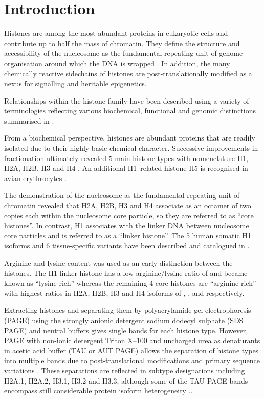 \section{Introduction}

  Histones are among the most abundant proteins in eukaryotic cells and contribute up to half the mass of chromatin. 
  They define the structure and accessibility of the nucleosome as the fundamental repeating unit of genome organisation 
  around which the DNA is wrapped .
  In addition, the many chemically reactive sidechains of histones are post-translationally modified 
  as a nexus for signalling and heritable epigenetics. 

  Relationships within the histone family have been described using a variety of terminologies
  reflecting various biochemical, functional and genomic distinctions summarised in .
  
  From a biochemical perspective, histones are abundant proteins 
  that are readily isolated due to their highly basic chemical character. 
  Successive improvements in fractionation ultimately revealed 5 main histone types 
  with nomenclature H1, H2A, H2B, H3 and H4 \citep{nomenclature}.
  An additional H1--related histone H5 is recognised in avian erythrocytes \citep{HFive-review}.

  The demonstration of the nucleosome as the fundamental repeating unit of chromatin  
  revealed that H2A, H2B, H3 and H4 associate as an octamer of two copies each within the
  nucleosome core particle, so they are referred to as ``core histones''. 
  In contrast, H1 associates with the linker DNA between nucleosome core particles and is referred to as a ``linker histone''. 
  The 5 human somatic H1 isoforms and 6 tissue-specific variants have been described and catalogued in .

  Arginine and lysine content was used as an early distinction between the histones. 
  The H1 linker histone has a low arginine/lysine ratio of \LinkerArgLysRatio{} and became known as ``lysine-rich'' 
  whereas the remaining 4 core histones are ``arginine-rich'' with highest ratios in H2A, H2B, H3 and H4 isoforms of 
  \HTwoAArgLysRatio{}, \HTwoBArgLysRatio{}, \HThreeArgLysRatio{} and \HFourArgLysRatio{} respectively.

  Extracting histones and separating them by polyacrylamide gel electrophoresis (PAGE) 
  using the strongly anionic detergent sodium dodecyl sulphate (SDS PAGE) and neutral buffers 
  gives single bands for each histone type. 
  However, PAGE with non-ionic detergent Triton X--100 and uncharged urea as denaturants
  in acetic acid buffer (TAU or AUT PAGE) allows the separation of histone types into multiple bands 
  due to post-translational modifications and primary sequence variations \citep{PAGEND}. 
  These separations are reflected in subtype designations including H2A.1, H2A.2, H3.1, H3.2 and H3.3, 
  although some of the TAU PAGE bands encompass still considerable protein isoform heterogeneity \addref{}..


